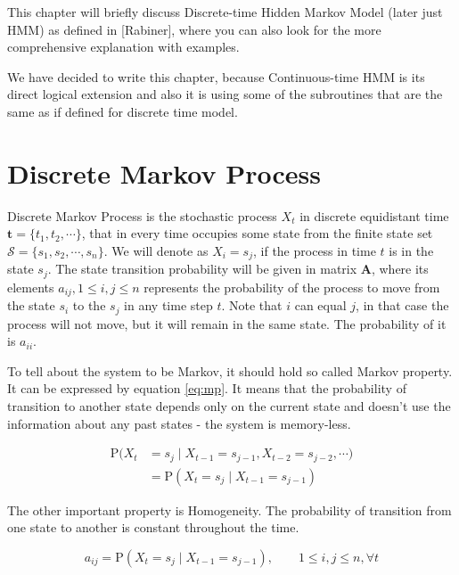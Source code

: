 \documentclass[thesis=M,english]{FITthesis}[2012/10/20]
\newcommand{\matr}[1]{\mathbf{#1}}
\begin{document}
This chapter will briefly discuss Discrete-time Hidden Markov Model (later just HMM) as defined in [Rabiner], where you can also look for the more comprehensive explanation with examples.

We have decided to write this chapter, because Continuous-time HMM is its direct logical extension and also it is using some of the subroutines that are the same as if defined for discrete time model.

\section{Discrete Markov Process}\label{sec:DMP}
    
Discrete Markov Process is the stochastic process $X_t$ in discrete equidistant time $\matr{t} = \{ t_1,t_2,\cdots \}$, that in every time occupies some state from the finite state set $\mathcal{S} = \{ s_1, s_2, \cdots, s_n\}$. We will denote as $X_i = s_j$, if the process in time $t$ is in the state $s_j$. The state transition probability will be given in matrix $\matr{A}$, where its elements $a_{ij}, 1\leq i,j \leq n$ represents the probability of the process to move from the state $s_i$ to the $s_j$ in any time step $t$.  Note that $i$ can equal $j$, in that case the process will not move, but it  will remain in the same state. The probability of it is $a_{ii}$.

To tell about the system to be Markov, it should hold so called Markov property. It can be expressed by equation \eqref{eq:mp}. It means that the probability of transition to another state depends only on the current state and doesn't use the information about any past states - the system is memory-less.

\begin{equation}\label{eq:mp}
\begin{aligned}
\mathrm{P}(X_t & = s_j \mid X_{t-1} = s_{j-1}, X_{t-2} = s_{j-2}, \cdots)  \\   
               & = \mathrm{P}(X_t = s_j \mid X_{t-1} = s_{j-1} )
\end{aligned}
\end{equation}

The other important property is Homogeneity. The probability of transition from one state to another is constant throughout the time. 

\begin{equation}\label{eq:homo}
   a_{ij} = \mathrm{P}(X_t = s_j \mid X_{t-1} = s_{j-1} ),\qquad 1 \leq i,j \leq n, \forall t
\end{equation}
\end{document}
